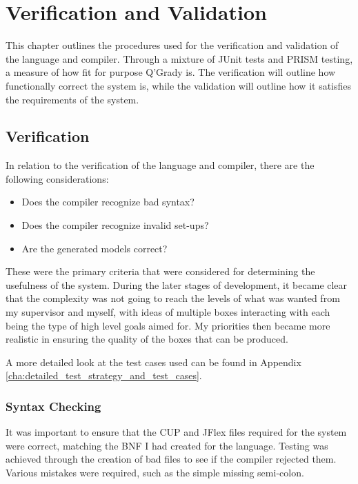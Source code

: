 \documentclass[report.tex]{subfiles}
\begin{document}
\chapter{Verification and Validation} %
\label{cha:verification_and_validation}
This chapter outlines the procedures used for the verification and validation of
the language and compiler. Through a mixture of JUnit tests and PRISM testing,
a measure of how fit for purpose Q'Grady is. The verification will outline how
functionally correct the system is, while the validation will outline how it
satisfies the requirements of the system.

\section{Verification} %
\label{sec:verification}
In relation to the verification of the language and compiler, there are the
following considerations:
\begin{itemize}
    \item Does the compiler recognize bad syntax?
    \item Does the compiler recognize invalid set-ups?
    \item Are the generated models correct?
\end{itemize}

These were the primary criteria that were considered for determining the
usefulness of the system. During the later stages of development, it became
clear that the complexity was not going to reach the levels of what was wanted
from my supervisor and myself, with ideas of multiple boxes interacting with
each being the type of high level goals aimed for. My priorities then became
more realistic in ensuring the quality of the boxes that can be produced.

A more detailed look at the test cases used can be found in Appendix
\ref{cha:detailed_test_strategy_and_test_cases}.

\subsection{Syntax Checking} %
\label{sub:syntax_checking}
It was important to ensure that the CUP and JFlex files required for the system
were correct, matching the BNF I had created for the language. Testing was
achieved through the creation of bad files to see if the compiler rejected them.
Various mistakes were required, such as the simple missing semi-colon.
\end{document}
